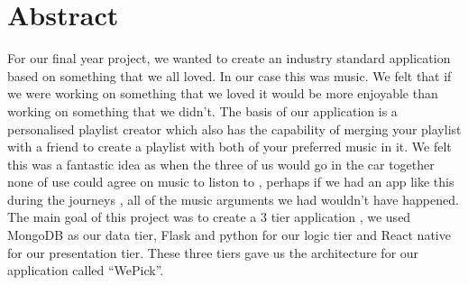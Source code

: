 
\chapter*{Abstract}
For our final year project, we wanted to create an industry standard application based on something that we all loved. In our case this was music. We felt that if we were working on something that we loved it would be more enjoyable than working on something that we didn’t. The basis of our application is a personalised playlist creator which also has the capability of merging your playlist with a friend to create a playlist with both of your preferred music in it. We felt this was a fantastic idea as when the three of us would go in the car together none of use could agree on music to liston to ,  perhaps if we had an app like this during the journeys , all of the music arguments we had wouldn’t have happened. The main goal of this project was to create a 3 tier application , we used MongoDB as our data tier, Flask and python for our logic tier and React native for our presentation tier. These three tiers gave us the architecture for our application called “WePick”.


